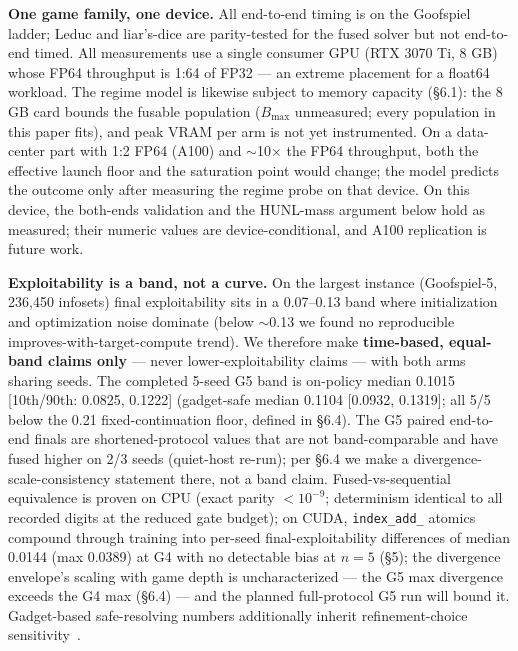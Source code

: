 \documentclass[11pt]{article}
\begin{document}
\textbf{One game family, one device.} All end-to-end timing is on the Goofspiel ladder;
Leduc and liar's-dice are parity-tested for the fused solver but not end-to-end timed.
All measurements use a single consumer GPU (RTX 3070 Ti, 8 GB) whose FP64 throughput is
1:64 of FP32 --- an extreme placement for a float64 workload. The regime model is
likewise subject to memory capacity (\S6.1): the 8 GB card bounds the fusable population
($B_{\max}$ unmeasured; every population in this paper fits), and peak VRAM per arm is
not yet instrumented. On a data-center part with 1:2 FP64 (A100) and $\sim$10$\times$
the FP64 throughput, both the effective launch floor and the saturation point would
change; the model predicts the outcome only after measuring the regime probe on that
device. On this device, the both-ends validation and the HUNL-mass argument below hold
as measured; their numeric values are device-conditional, and A100 replication is
future work.

\textbf{Exploitability is a band, not a curve.} On the largest instance (Goofspiel-5,
236,450 infosets) final exploitability sits in a 0.07--0.13 band where initialization
and optimization noise dominate (below $\sim$0.13 we found no reproducible
improves-with-target-compute trend). We therefore make \textbf{time-based, equal-band
claims only} --- never lower-exploitability claims --- with both arms sharing seeds. The
completed 5-seed G5 band is on-policy median 0.1015 [10th/90th: 0.0825, 0.1222]
(gadget-safe median 0.1104 [0.0932, 0.1319]; all 5/5 below the 0.21 fixed-continuation
floor, defined in \S6.4). The G5 paired end-to-end finals are shortened-protocol values
that are not band-comparable and have fused higher on 2/3 seeds (quiet-host re-run); per
\S6.4 we make a divergence-scale-consistency statement there, not a band claim.
Fused-vs-sequential equivalence is proven on CPU (exact parity $<10^{-9}$; determinism
identical to all recorded digits at the reduced gate budget); on CUDA,
\texttt{index\_add\_} atomics compound through training into per-seed
final-exploitability differences of median 0.0144 (max 0.0389) at G4 with no detectable
bias at $n{=}5$ (\S5); the divergence envelope's scaling with game depth is
uncharacterized --- the G5 max divergence exceeds the G4 max (\S6.4) --- and the planned
full-protocol G5 run will bound it. Gadget-based safe-resolving numbers additionally
inherit refinement-choice sensitivity~\citep{Kubicek2026}.
\end{document}
